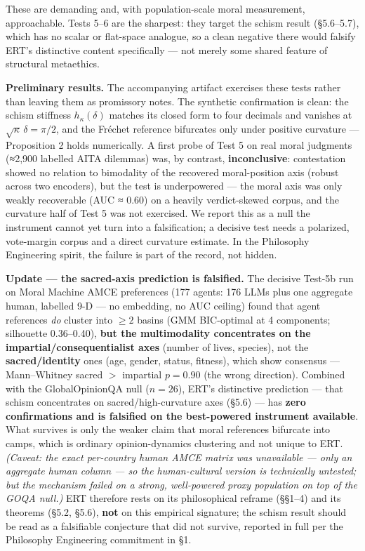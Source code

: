 \documentclass[
]{article}
\begin{document}
These are demanding and, with population-scale moral measurement,
approachable. Tests 5--6 are the sharpest: they target the schism result
(§5.6--5.7), which has no scalar or flat-space analogue, so a clean
negative there would falsify ERT's distinctive content specifically ---
not merely some shared feature of structural metaethics.

\textbf{Preliminary results.} The accompanying artifact exercises these
tests rather than leaving them as promissory notes. The synthetic
confirmation is clean: the schism stiffness \(h_\kappa(\delta)\) matches
its closed form to four decimals and vanishes at
\(\sqrt\kappa\,\delta=\pi/2\), and the Fréchet reference bifurcates only
under positive curvature --- Proposition 2 holds numerically. A first
probe of Test 5 on real moral judgments (≈2,900 labelled AITA dilemmas)
was, by contrast, \textbf{inconclusive}: contestation showed no relation
to bimodality of the recovered moral-position axis (robust across two
encoders), but the test is underpowered --- the moral axis was only
weakly recoverable (AUC ≈ 0.60) on a heavily verdict-skewed corpus, and
the curvature half of Test 5 was not exercised. We report this as a null
the instrument cannot yet turn into a falsification; a decisive test
needs a polarized, vote-margin corpus and a direct curvature estimate.
In the Philosophy Engineering spirit, the failure is part of the record,
not hidden.

\textbf{Update --- the sacred-axis prediction is falsified.} The
decisive Test-5b run on Moral Machine AMCE preferences (177 agents: 176
LLMs plus one aggregate human, labelled 9-D --- no embedding, no AUC
ceiling) found that agent references \emph{do} cluster into \(\ge 2\)
basins (GMM BIC-optimal at 4 components; silhouette 0.36--0.40),
\textbf{but the multimodality concentrates on the
impartial/consequentialist axes} (number of lives, species), not the
\textbf{sacred/identity} ones (age, gender, status, fitness), which show
consensus --- Mann--Whitney sacred \(>\) impartial \(p=0.90\) (the wrong
direction). Combined with the GlobalOpinionQA null (\(n=26\)), ERT's
distinctive prediction --- that schism concentrates on
sacred/high-curvature axes (§5.6) --- has \textbf{zero confirmations and
is falsified on the best-powered instrument available}. What survives is
only the weaker claim that moral references bifurcate into camps, which
is ordinary opinion-dynamics clustering and not unique to ERT.
\emph{(Caveat: the exact per-country human AMCE matrix was unavailable
--- only an aggregate human column --- so the human-cultural version is
technically untested; but the mechanism failed on a strong, well-powered
proxy population on top of the GOQA null.)} ERT therefore rests on its
philosophical reframe (§§1--4) and its theorems (§5.2, §5.6),
\textbf{not} on this empirical signature; the schism result should be
read as a falsifiable conjecture that did not survive, reported in full
per the Philosophy Engineering commitment in §1.
\end{document}
